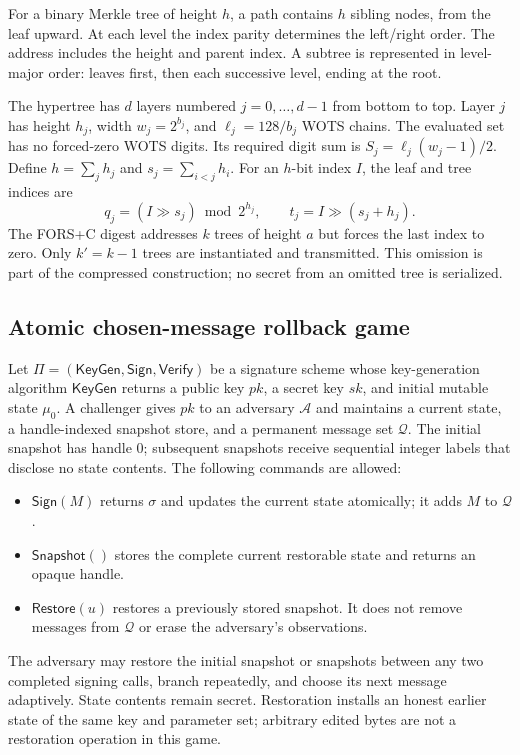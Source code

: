 \documentclass[a4paper,envcountsame,runningheads]{llncs}
\newcommand{\KG}{\mathsf{KeyGen}}
\newcommand{\Sign}{\mathsf{Sign}}
\newcommand{\Vf}{\mathsf{Verify}}
\begin{document}
For a binary Merkle tree of height $h$, a path contains $h$ sibling nodes, from the leaf upward. At each level the index parity determines the left/right order. The address includes the height and parent index. A subtree is represented in level-major order: leaves first, then each successive level, ending at the root.

The hypertree has $d$ layers numbered $j=0,\ldots,d-1$ from bottom to top. Layer $j$ has height $h_j$, width $w_j=2^{b_j}$, and $\ell_j=128/b_j$ WOTS chains. The evaluated set has no forced-zero WOTS digits. Its required digit sum is $S_j=\ell_j(w_j-1)/2$. Define $h=\sum_j h_j$ and $s_j=\sum_{i<j}h_i$. For an $h$-bit index $I$, the leaf and tree indices are
\begin{equation}\label{eq:route}
 q_j=(I\mathbin{\gg}s_j)\bmod 2^{h_j},\qquad
 t_j=I\mathbin{\gg}(s_j+h_j).
\end{equation}
The FORS+C digest addresses $k$ trees of height $a$ but forces the last index to zero. Only $k'=k-1$ trees are instantiated and transmitted. This omission is part of the compressed construction; no secret from an omitted tree is serialized.

\subsection{Atomic chosen-message rollback game}\label{sec:game}
Let $\Pi=(\KG,\Sign,\Vf)$ be a signature scheme whose key-generation algorithm $\KG$ returns a public key $pk$, a secret key $sk$, and initial mutable state $\mu_0$. A challenger gives $pk$ to an adversary $\mathcal A$ and maintains a current state, a handle-indexed snapshot store, and a permanent message set $\mathcal Q$. The initial snapshot has handle 0; subsequent snapshots receive sequential integer labels that disclose no state contents. The following commands are allowed:
\begin{itemize}
\item $\mathsf{Sign}(M)$ returns $\sigma$ and updates the current state atomically; it adds $M$ to $\mathcal Q$.
\item $\mathsf{Snapshot}()$ stores the complete current restorable state and returns an opaque handle.
\item $\mathsf{Restore}(u)$ restores a previously stored snapshot. It does not remove messages from $\mathcal Q$ or erase the adversary's observations.
\end{itemize}
The adversary may restore the initial snapshot or snapshots between any two completed signing calls, branch repeatedly, and choose its next message adaptively. State contents remain secret. Restoration installs an honest earlier state of the same key and parameter set; arbitrary edited bytes are not a restoration operation in this game.
\end{document}
